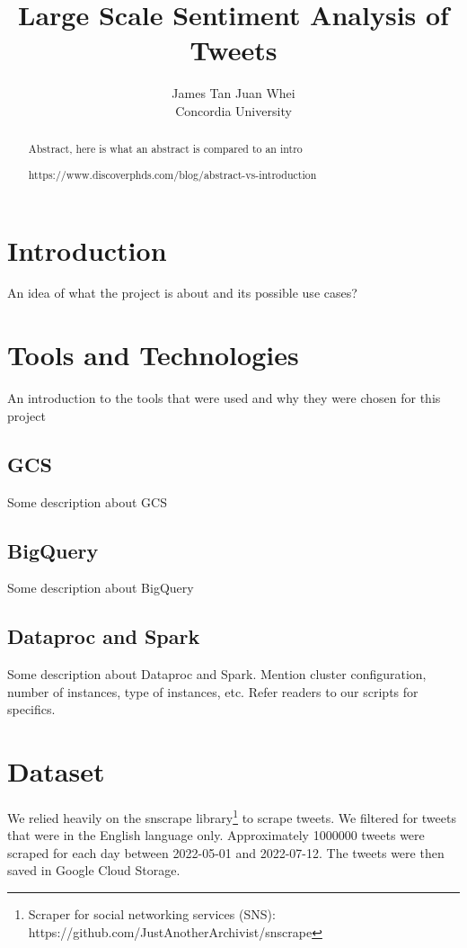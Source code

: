 \documentclass[a4paper,12pt]{article}
\begin{document}
\title{Large Scale Sentiment Analysis of Tweets }%
\author{
	James Tan Juan Whei\\
	Concordia University
}  
\maketitle

\begin{abstract}
Abstract, here is what an abstract is compared to an intro

https://www.discoverphds.com/blog/abstract-vs-introduction
\end{abstract}

\section{Introduction}

An idea of what the project is about and its possible use cases?

\section{Tools and Technologies}
An introduction to the tools that were used and why they were chosen for this project

\subsection{GCS}
Some description about GCS

\subsection{BigQuery}
Some description about BigQuery

\subsection{Dataproc and Spark}
\label{sec:spark}
Some description about Dataproc and Spark. Mention cluster configuration, number of instances, type of instances, etc. Refer readers to our scripts for specifics.

\section{Dataset}
\label{sec:dataset}
We relied heavily on the snscrape library\footnote{Scraper for social networking services (SNS): https://github.com/JustAnotherArchivist/snscrape} to scrape tweets. We filtered for tweets that were in the English language only. Approximately 1000000 tweets were scraped for each day between 2022-05-01 and 2022-07-12. The tweets were then saved in Google Cloud Storage.
\end{document}
